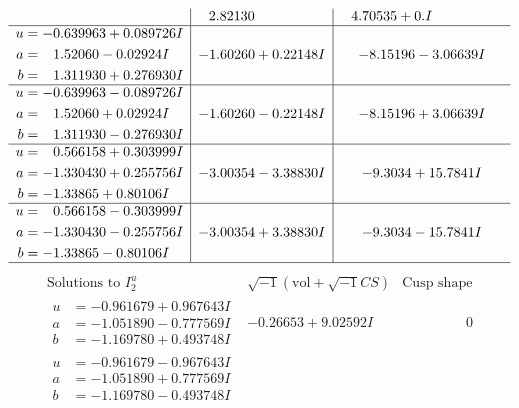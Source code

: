 \documentclass[1p]{elsarticle_modified}
\theoremstyle{definition}
\newcommand{\I}{\sqrt{-1}}
\begin{document}
$$\begin{array}{c|c|c}
 & \phantom{-}2.82130\phantom{ +0.000000I} & \phantom{-}4.70535 + 0. I\phantom{ +0.000000I} \\ \hline\begin{aligned}
u &= -0.639963 + 0.089726 I \\
a &= \phantom{-}1.52060 - 0.02924 I \\
b &= \phantom{-}1.311930 + 0.276930 I\end{aligned}
 & -1.60260 + 0.22148 I & -8.15196 - 3.06639 I \\ \hline\begin{aligned}
u &= -0.639963 - 0.089726 I \\
a &= \phantom{-}1.52060 + 0.02924 I \\
b &= \phantom{-}1.311930 - 0.276930 I\end{aligned}
 & -1.60260 - 0.22148 I & -8.15196 + 3.06639 I \\ \hline\begin{aligned}
u &= \phantom{-}0.566158 + 0.303999 I \\
a &= -1.330430 + 0.255756 I \\
b &= -1.33865 + 0.80106 I\end{aligned}
 & -3.00354 - 3.38830 I & -9.3034 + 15.7841 I \\ \hline\begin{aligned}
u &= \phantom{-}0.566158 - 0.303999 I \\
a &= -1.330430 - 0.255756 I \\
b &= -1.33865 - 0.80106 I\end{aligned}
 & -3.00354 + 3.38830 I & -9.3034 - 15.7841 I\\
 \hline 
 \end{array}$$\newpage$$\begin{array}{c|c|c}  
\text{Solutions to }I^u_{2}& \I (\text{vol} + \sqrt{-1}CS) & \text{Cusp shape}\\
 \hline 
\begin{aligned}
u &= -0.961679 + 0.967643 I \\
a &= -1.051890 - 0.777569 I \\
b &= -1.169780 + 0.493748 I\end{aligned}
 & -0.26653 + 9.02592 I & \phantom{-0.000000 } 0 \\ \hline\begin{aligned}
u &= -0.961679 - 0.967643 I \\
a &= -1.051890 + 0.777569 I \\
b &= -1.169780 - 0.493748 I\end{aligned}

\end{array}$$
\end{document}
